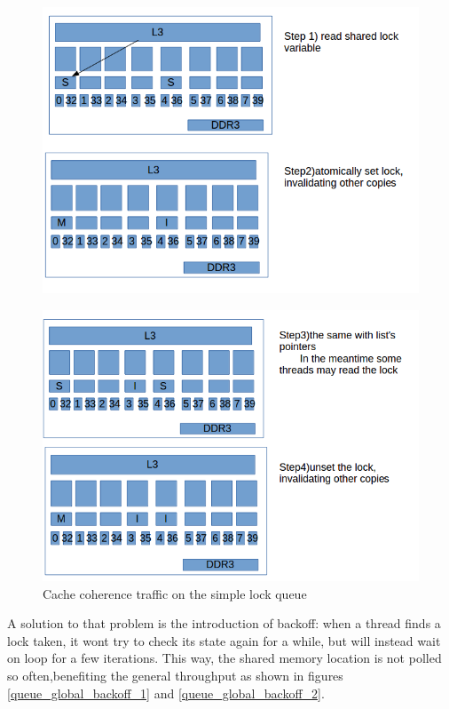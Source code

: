 \begin{figure}
 \centering
  \includegraphics[scale=0.5]{sandman_ping_pong_1.png}
\label{sandman_ping_pong_1}
\end{figure}
\begin{figure}
 \centering
  \includegraphics[scale=0.5]{sandman_ping_pong_2.png}
\caption{Cache coherence traffic on the simple lock queue}
\label{sandman_ping_pong_2}
\end{figure}

A solution to that problem is the introduction of backoff: when a thread finds a lock taken, it wont try to check its state again for a while, but will instead wait on loop for a few iterations. This way, the shared memory location is not polled so often,benefiting the general throughput as shown in figures \ref{queue_global_backoff_1} and \ref{queue_global_backoff_2}.


